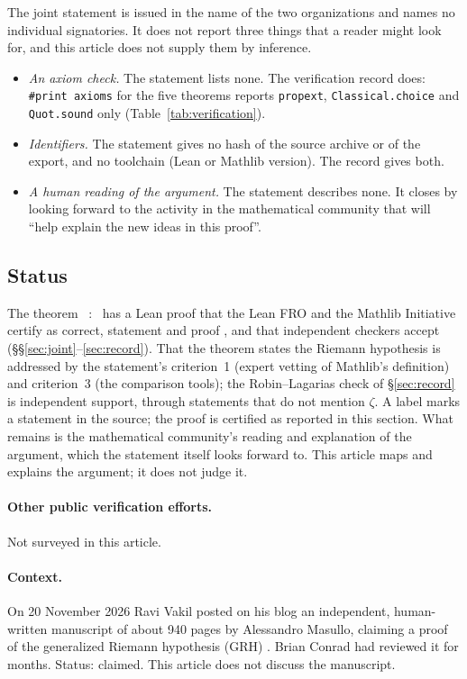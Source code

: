 The joint statement is issued in the name of the two organizations and names no individual
signatories. It does not report three things that a reader might look for, and this article does
not supply them by inference.
\begin{itemize}
\item \emph{An axiom check.} The statement lists none. The verification record does:
  \texttt{\#print axioms} for the five theorems reports \texttt{propext}, \texttt{Classical.choice}
  and \texttt{Quot.sound} only (Table~\ref{tab:verification}).
\item \emph{Identifiers.} The statement gives no hash of the source archive or of the export, and no
  toolchain (Lean or Mathlib version). The record gives both.
\item \emph{A human reading of the argument.} The statement describes none. It closes by looking
  forward to the activity in the mathematical community that will ``help explain the new ideas in
  this proof''.
\end{itemize}

\subsection{Status}\label{sec:status}

The theorem ~:~ has a Lean proof that the Lean
FRO and the Mathlib Initiative certify as correct, statement and proof \cite{leanfro-mathlib}, and
that independent checkers accept (\S\S\ref{sec:joint}--\ref{sec:record}). That the theorem states the
Riemann hypothesis is addressed by the statement's criterion~1 (expert vetting of Mathlib's
definition) and criterion~3 (the comparison tools); the Robin--Lagarias check of \S\ref{sec:record}
is independent support, through statements that do not mention $\zeta$. A  label marks a
statement in the source; the proof is certified as reported in this section. What remains is the
mathematical community's reading and explanation of the argument, which the statement itself looks
forward to. This article maps and explains the argument; it does not judge it.

\paragraph{Other public verification efforts.} Not surveyed in this article.

\paragraph{Context.} On 20 November 2026 Ravi Vakil posted on his blog an independent,
human-written manuscript of about 940 pages by Alessandro Masullo, claiming a proof of the
generalized Riemann hypothesis (GRH) \cite{vakil-masullo}. Brian Conrad had reviewed it for months.
Status: claimed. This article does not discuss the manuscript.
